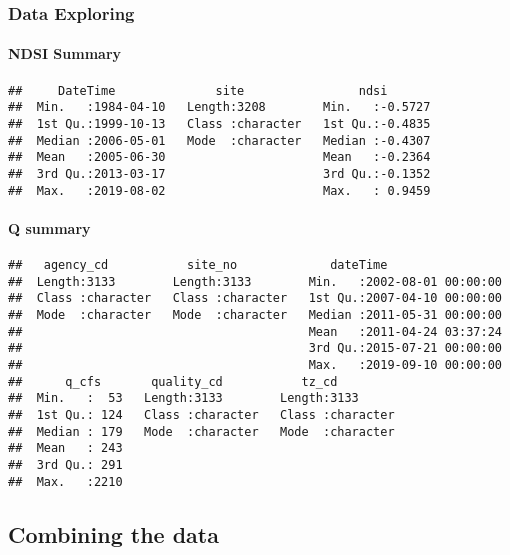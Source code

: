 \documentclass[]{article}
\let\oldparagraph\paragraph
\renewcommand{\paragraph}[1]{\oldparagraph{#1}\mbox{}}
\begin{document}
\hypertarget{data-exploring}{%
\subsubsection{Data Exploring}\label{data-exploring}}

\hypertarget{ndsi-summary}{%
\paragraph{NDSI Summary}\label{ndsi-summary}}

\begin{verbatim}
##     DateTime              site                ndsi        
##  Min.   :1984-04-10   Length:3208        Min.   :-0.5727  
##  1st Qu.:1999-10-13   Class :character   1st Qu.:-0.4835  
##  Median :2006-05-01   Mode  :character   Median :-0.4307  
##  Mean   :2005-06-30                      Mean   :-0.2364  
##  3rd Qu.:2013-03-17                      3rd Qu.:-0.1352  
##  Max.   :2019-08-02                      Max.   : 0.9459
\end{verbatim}

\hypertarget{q-summary}{%
\paragraph{Q summary}\label{q-summary}}

\begin{verbatim}
##   agency_cd           site_no             dateTime                  
##  Length:3133        Length:3133        Min.   :2002-08-01 00:00:00  
##  Class :character   Class :character   1st Qu.:2007-04-10 00:00:00  
##  Mode  :character   Mode  :character   Median :2011-05-31 00:00:00  
##                                        Mean   :2011-04-24 03:37:24  
##                                        3rd Qu.:2015-07-21 00:00:00  
##                                        Max.   :2019-09-10 00:00:00  
##      q_cfs       quality_cd           tz_cd          
##  Min.   :  53   Length:3133        Length:3133       
##  1st Qu.: 124   Class :character   Class :character  
##  Median : 179   Mode  :character   Mode  :character  
##  Mean   : 243                                        
##  3rd Qu.: 291                                        
##  Max.   :2210
\end{verbatim}

\hypertarget{combining-the-data}{%
\subsection{Combining the data}\label{combining-the-data}}
\end{document}
